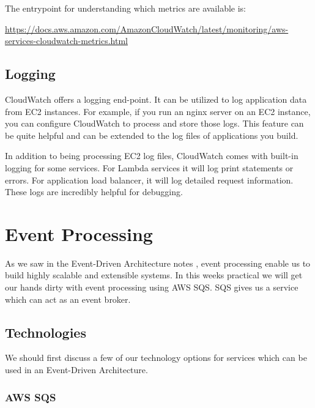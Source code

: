 \documentclass{csse4400}
\begin{document}
\noindent The entrypoint for understanding which metrics are available is:

\noindent \url{https://docs.aws.amazon.com/AmazonCloudWatch/latest/monitoring/aws-services-cloudwatch-metrics.html}

\subsection{Logging}
CloudWatch offers a logging end-point.
It can be utilized to log application data from EC2 instances.
For example, if you run an nginx server on an EC2 instance,
you can configure CloudWatch to process and store those logs.
This feature can be quite helpful and can be extended to the log files of applications you build.

In addition to being processing EC2 log files,
CloudWatch comes with built-in logging for some services.
For Lambda services it will log print statements or errors.
For application load balancer,
it will log detailed request information.
These logs are incredibly helpful for debugging.


\section{Event Processing}

As we saw in the Event-Driven Architecture notes \cite{events-notes},
event processing enable us to build highly scalable and extensible systems.
In this weeks practical we will get our hands dirty with event processing using AWS SQS.
SQS gives us a service which can act as an event broker.

\subsection{Technologies}

We should first discuss a few of our technology options for services which can be used in an Event-Driven Architecture.


\subsubsection{AWS SQS}
\end{document}
